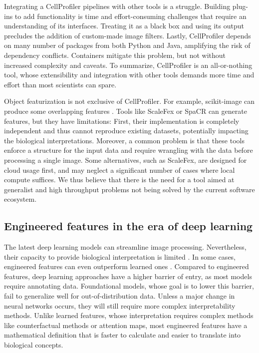 \documentclass{article}
\begin{document}
Integrating a CellProfiler pipelines with other tools is a struggle. Building plug-ins to add functionality is time and effort-consuming challenges that require an understanding of its interfaces. Treating it as a black box and using its output precludes the addition of custom-made image filters. Lastly, CellProfiler depends on many number of packages from both Python and Java, amplifying the risk of dependency conflicts. Containers mitigate this problem, but not without increased complexity and caveats. To summarize, CellProfiler is an all-or-nothing tool, whose extensibility and integration with other tools demands more time and effort than most scientists can spare.

Object featurization is not exclusive of CellProfiler. For example, scikit-image can produce some overlapping features \citep{waltScikitimageImageProcessing2014}. Tools like ScaleFex or SpaCR \citep{comoletHighlyEfficientScalable2024,einarolafssonSpaCr2025} can generate features, but they have limitations: First, their implementation is completely independent and thus cannot reproduce existing datasets, potentially impacting the biological interpretations. Moreover, a common problem is that these tools enforce a structure for the input data and require wrangling with the data before processing a single image. Some alternatives, such as ScaleFex, are designed for cloud usage first, and may neglect a significant number of cases where local compute suffices. We thus believe that there is the need for a tool aimed at generalist and high throughput problems not being solved by the current software ecosystem.
\subsection{Engineered features in the era of deep learning}
\label{sec:org9dc3dfa}
The latest deep learning models can streamline image processing. Nevertheless, their capacity to provide biological interpretation is limited \citep{moenDeepLearningCellular2019}. In some cases, engineered features can even outperform learned ones \citep{tangMorphologicalProfilingDrug2024}. Compared to engineered features, deep learning approaches have a higher barrier of entry, as most models require annotating data. Foundational models, whose goal is to lower this barrier, fail to generalize well for out-of-distribution data. Unless a major change in neural networks occurs, they will still require more complex interpretability methods. Unlike learned features, whose interpretation requires complex methods like counterfactual methods or attention maps, most engineered features have a mathematical definition that is faster to calculate and easier to translate into biological concepts.
\end{document}
